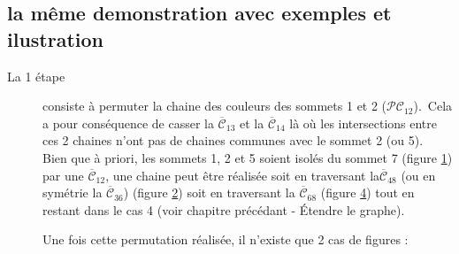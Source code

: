 \documentclass[french]{report}
\begin{document}
\subsection{la même demonstration avec exemples et ilustration}
\begin{description}
\item[La 1 étape] consiste à permuter la chaine des couleurs des sommets 1 et 2 ($\mathcal{PC}_{12}$).\
Cela a pour conséquence de casser la $\overline{\mathcal{C}}_{13}$ et la $\overline{\mathcal{C}}_{14}$ là où les intersections entre ces 2 chaines n'ont pas de chaines communes avec le sommet 2 (ou 5).\\

Bien que à priori, les sommets 1, 2 et 5 soient isolés du sommet 7 (figure \ref{fig:cas4_etap1_1}) par une $\overline{\mathcal{C}}_{12}$, une chaine peut être réalisée soit en traversant la$\overline{\mathcal{C}}_{48}$ (ou en symétrie la $\overline{\mathcal{C}}_{36}$) (figure \ref{fig:cas4_etap1_2}) soit en traversant la $\overline{\mathcal{C}}_{68}$ (figure \ref{fig:cas4_etap1_3})  tout en restant dans le cas 4 (voir chapitre précédant - Étendre le graphe).
\FloatBarrier
\begin{figure}[!ht]\centering
	\begin{changemargin}{-5cm}{-3cm}
	\begin{center}
		\begin{subfigure}{0.4\textwidth}
			
			\caption{}\label{fig:cas4_etap1_1}
		\end{subfigure}
		\begin{subfigure}{0.3\textwidth}
			
			\caption{}\label{fig:cas4_etap1_2}
		\end{subfigure}
		\begin{subfigure}{0.1\textwidth}
			
			\caption{}\label{fig:cas4_etap1_3}
		\end{subfigure}
	\end{center}
	\caption{}
	\end{changemargin}
\end{figure}	
\FloatBarrier

Une fois cette permutation réalisée, il n'existe que 2 cas de figures : \\
\end{description}
\end{document}
